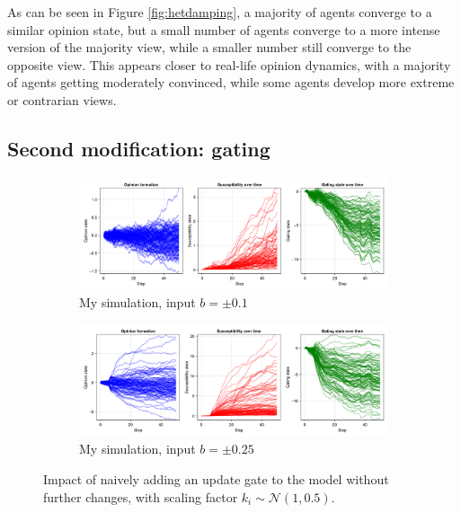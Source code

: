 \documentclass[]{article}
\begin{document}
As can be seen in Figure \ref{fig:hetdamping}, a majority of agents converge to a similar opinion state, but a small number of agents converge to a more intense version of the majority view, while a smaller number still converge to the opposite view. This appears closer to real-life opinion dynamics, with a majority of agents getting moderately convinced, while some agents develop more extreme or contrarian views.

\subsection{Second modification: gating}

\begin{figure}
	\centering
	\begin{subfigure}[t]{0.6\textwidth}
		\centering
		\includegraphics[width=\textwidth]{../plots/wg_hetd_lowsig.png} 
		\caption{My simulation, input $b = \pm 0.1 $} \label{fig:gating1}
	\end{subfigure}
	
	\begin{subfigure}[t]{0.6\textwidth}
		\centering
		\includegraphics[width=\textwidth]{../plots/wg_hetd_medsig.png} 
		\caption{My simulation, input $b = \pm 0.25 $} \label{fig:gating2}
	\end{subfigure}
	
	\caption{Impact of naively adding an update gate to the model without further changes, with scaling factor $k_i \sim \mathcal{N}(1,0.5)$.}\label{fig:gatingintro}
\end{figure}
\end{document}
